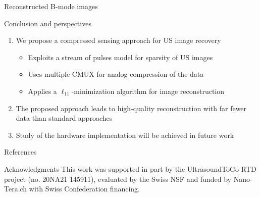 {\begin{block}{Reconstructed B-mode images}
\end{block}
\vfill

\begin{block}{Conclusion and perspectives}
	\begin{enumerate}
		\item We propose a compressed sensing approach for US image recovery
		\begin{itemize}
			\item Exploits a stream of pulses model for sparsity of US images
			\item Uses multiple CMUX for analog compression of the data
			\item Applies a $\ell_{11}$-minimization algorithm for image reconstruction
		\end{itemize}
		\item The proposed approach leads to high-quality reconstruction with far fewer data than standard approaches
		\item Study of the hardware implementation will be achieved in future work
	\end{enumerate}
\end{block}
\vfill
\begin{block}{References}
	\printbibliography
\end{block}
\vfill
\begin{block}{Acknowledgments}
	This work was supported in part by the UltrasoundToGo RTD project (no. 20NA21 145911), evaluated by the Swiss NSF and funded by Nano-Tera.ch with Swiss Confederation financing.
\end{block}
}%